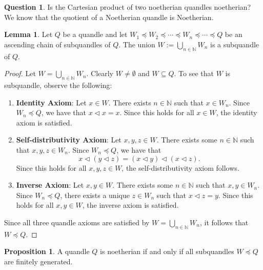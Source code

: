 \documentclass[reqno,dvipsnames]{amsart}
\newcommand{\N}{\mathbb{N}}
\theoremstyle{definition}
\newtheorem{proposition}[theorem]{Proposition}
\newtheorem{lemma}[theorem]{Lemma}
\newtheorem{question}[theorem]{Question}
\begin{document}
\begin{question}
Is the Cartesian product of two noetherian quandles noetherian? We know that the quotient of a Noetherian quandle is Noetherian.
\end{question}

\begin{lemma}
Let $Q$ be a quandle and let $W_1\preceq W_2\preceq\cdots\preceq W_n\preceq\cdots\preceq Q$ be an ascending chain of subquandles of $Q$. The union $W:=\bigcup_{n\in\N}W_n$ is a subquandle of $Q$.
\end{lemma}

\begin{proof}
Let $W=\bigcup_{n\in\N}W_n$. Clearly $W\neq\emptyset$ and $W\subseteq Q$. To see that $W$ is subquandle, observe the following:
\begin{enumerate}
    \item \textbf{Identity Axiom}: Let $x\in W$. There exists $n\in\N$ such that $x\in W_n$. Since $W_n\preceq Q$, we have that $x\triangleleft x=x$. Since this holds for all $x\in W$, the identity axiom is satisfied.
    \item \textbf{Self-distributivity Axiom}: Let $x,y,z\in W$. There exists some $n\in\N$ such that $x,y,z\in W_n$. Since $W_n\preceq Q$, we have that
    \[x\triangleleft(y\triangleleft z)=(x\triangleleft y)\triangleleft(x\triangleleft z).\]
    Since this holds for all $x,y,z\in W$, the self-distributivity axiom follows.
    \item \textbf{Inverse Axiom}: Let $x,y\in W$. There exists some $n\in\N$ such that $x,y\in W_n$. Since $W_n\preceq Q$, there exists a unique $z\in W_n$ such that $x\triangleleft z=y$. Since this holds for all $x,y\in W$, the inverse axiom is satisfied.
\end{enumerate}
Since all three quandle axioms are satisfied by $W=\bigcup_{n\in\N}W_n$, it follows that $W\preceq Q$.
\end{proof}

\begin{proposition}
A quandle $Q$ is noetherian if and only if all subquandles $W\preceq Q$ are finitely generated.
\end{proposition}
\end{document}
